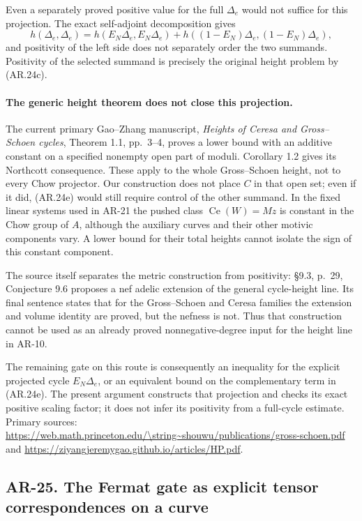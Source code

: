 \documentclass[11pt,a4paper]{article}
\begin{document}
Even a separately proved positive value for the full $\Delta_e$
would not suffice for this projection.  The exact self-adjoint
decomposition gives
\[
 h(\Delta_e,\Delta_e)
 =h(E_N\Delta_e,E_N\Delta_e)
  +h((1-E_N)\Delta_e,(1-E_N)\Delta_e),                 \tag{AR.24e}
\]
and positivity of the left side does not separately order the two
summands.  Positivity of the selected summand is precisely the
original height problem by (AR.24c).

\paragraph{The generic height theorem does not close this projection.}
The current primary Gao--Zhang manuscript, \emph{Heights of Ceresa
and Gross--Schoen cycles}, Theorem 1.1, pp.~3--4, proves a lower
bound with an additive constant on a specified nonempty open part
of moduli.  Corollary 1.2 gives its Northcott consequence.  These
apply to the whole Gross--Schoen height, not to every Chow
projector.  Our construction does not place $C$ in that open set;
even if it did, (AR.24e) would still require control of the other
summand.  In the fixed linear systems used in AR-21 the pushed
class $\operatorname{Ce}(W)=Mz$ is constant in the Chow group of
$A$, although the auxiliary curves and their other motivic
components vary.  A lower bound for their total heights cannot
isolate the sign of this constant component.

The source itself separates the metric construction from positivity:
\S9.3, p.~29, Conjecture 9.6 proposes a nef adelic extension of the
general cycle-height line.  Its final sentence states that for the
Gross--Schoen and Ceresa families the extension and volume identity
are proved, but the nefness is not.  Thus that construction cannot
be used as an already proved nonnegative-degree input for the
height line in AR-10.

The remaining gate on this route is consequently an inequality
for the explicit projected cycle $E_N\Delta_e$, or an equivalent
bound on the complementary term in (AR.24e).  The present argument
constructs that projection and checks its exact positive scaling
factor; it does not infer its positivity from a full-cycle estimate.
Primary sources:
\url{https://web.math.princeton.edu/\string~shouwu/publications/gross-schoen.pdf}
and \url{https://ziyangjeremygao.github.io/articles/HP.pdf}.
\subsection*{AR-25. The Fermat gate as explicit tensor correspondences on a curve}
\end{document}
